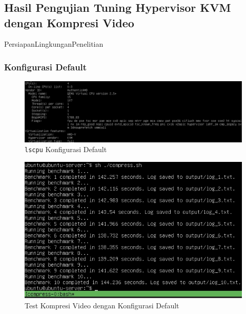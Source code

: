 \chapter{\babEmpat}

\section{Hasil Pengujian Tuning Hypervisor KVM dengan Kompresi Video}
PersiapanLingkunganPenelitian

\subsection{Konfigurasi Default}
\begin{figure}
    \centering
    \includegraphics[width=1\textwidth]
    {assets/pics/video-compression-test/lscpu_original.jpeg}
    \caption{\texttt{lscpu} Konfigurasi Default}
    \label{fig:lscpu_video_compression_test_original}
\end{figure}

\begin{figure}
    \centering
    \includegraphics[width=1\textwidth]
    {assets/pics/video-compression-test/original.jpeg}
    \caption{Test Kompresi Video dengan Konfigurasi Default}
    \label{fig:video_compression_test_original}
\end{figure}

